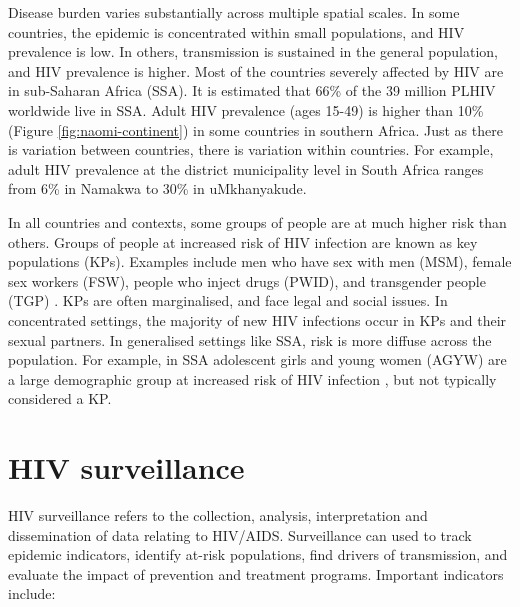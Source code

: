 \documentclass[a4paper, nobind]{templates/ociamthesis}
\begin{document}
Disease burden varies substantially across multiple spatial scales.
In some countries, the epidemic is concentrated within small populations, and HIV prevalence is low.
In others, transmission is sustained in the general population, and HIV prevalence is higher.
Most of the countries severely affected by HIV are in sub-Saharan Africa (SSA).
It is estimated that 66\% of the 39 million PLHIV worldwide live in SSA.
Adult HIV prevalence (ages 15-49) is higher than 10\% (Figure \ref{fig:naomi-continent}) in some countries in southern Africa.
Just as there is variation between countries, there is variation within countries.
For example, adult HIV prevalence at the district municipality level in South Africa ranges from 6\% in Namakwa to 30\% in uMkhanyakude.

In all countries and contexts, some groups of people are at much higher risk than others.
Groups of people at increased risk of HIV infection are known as key populations (KPs).
Examples include men who have sex with men (MSM), female sex workers (FSW), people who inject drugs (PWID), and transgender people (TGP) \autocite{stevens2022key}.
KPs are often marginalised, and face legal and social issues.
In concentrated settings, the majority of new HIV infections occur in KPs and their sexual partners.
In generalised settings like SSA, risk is more diffuse across the population.
For example, in SSA adolescent girls and young women (AGYW) are a large demographic group at increased risk of HIV infection \autocite{risher2021age,monod2023growing}, but not typically considered a KP.

\hypertarget{surveillance}{%
\section{HIV surveillance}\label{surveillance}}

HIV surveillance refers to the collection, analysis, interpretation and dissemination of data relating to HIV/AIDS.
Surveillance can used to track epidemic indicators, identify at-risk populations, find drivers of transmission, and evaluate the impact of prevention and treatment programs.
Important indicators include:
\end{document}
